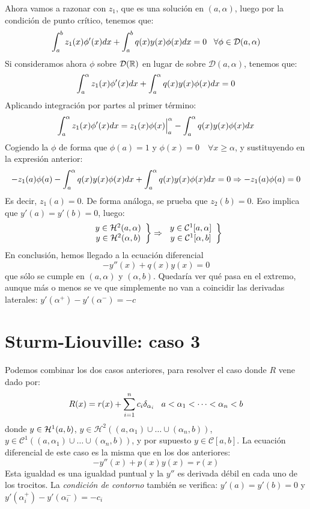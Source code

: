 Ahora vamos a razonar con $z_1$, que es una solución en $(a,\alpha)$, luego por la condición de punto crítico, tenemos que:
\[
\integral{a}{b}{z_1(x)\phi'(x)dx}+\integral{a}{b}{q(x)y(x)\phi(x)dx}=0 \espacio \forall\phi\in\mathcal{D}(a,\alpha)
\]
Si consideramos ahora $\phi$ sobre $\mathcal{D}(\R)$ en lugar de sobre $\mathcal{D}(a,\alpha)$, tenemos que:
\[
\integral{a}{\alpha}{z_1(x)\phi'(x)dx}+\integral{a}{\alpha}{q(x)y(x)\phi(x)dx}=0
\] 
Aplicando integración por partes al primer término:
\[
\integral{a}{\alpha}{z_1(x)\phi'(x)dx}=z_1(x)\phi(x)\Big|_a^\alpha-\integral{a}{\alpha}{q(x)y(x)\phi(x)dx}
\]
Cogiendo la $\phi$ de forma que $\phi(a)=1$ y $\phi(x)=0\quad\forall x\geq\alpha$, y sustituyendo en la expresión anterior:
\[
-z_1(a)\phi(a)-\integral{a}{\alpha}{q(x)y(x)\phi(x)dx}+\integral{a}{\alpha}{q(x)y(x)\phi(x)dx}=0 \Rightarrow -z_1(a)\phi(a)=0
\]
Es decir, $z_1(a)=0$. De forma análoga, se prueba que $z_2(b)=0$. Eso implica que $y'(a)=y'(b)=0$, luego: 
\[
\left.
\begin{array}{cc}
y\in\sobolev[a,\alpha]{2}\\
y\in\sobolev[\alpha,b]{2}
\end{array}
\right\} \Rightarrow
\left.
\begin{array}{cc}
y\in\mathcal{C}^1[a,\alpha]\\
y\in\mathcal{C}^1[\alpha,b]
\end{array}
\right\}
\]
En conclusión, hemos llegado a la ecuación diferencial
\[
-y''(x)+q(x)y(x)=0
\]
que sólo se cumple en $(a,\alpha)$ y $(\alpha,b)$. Quedaría ver qué pasa en el extremo, aunque más o menos se ve que simplemente no van a coincidir las derivadas laterales: $y'(\alpha^+)-y'(\alpha^-)=-c$

\section{Sturm-Liouville: caso 3}\label{slc3}

Podemos combinar los dos casos anteriores, para resolver el caso donde $R$ vene dado por:
\[
R(x)=r(x)+\sum_{i=1}^nc_i\delta_{\alpha_i} \espacio a<\alpha_1<\cdots<\alpha_n<b
\]
donde $y\in\sobolev{1}$, $y\in\mathcal{H}^2\left((a,\alpha_1)\cup\dots\cup(\alpha_n,b)\right)$, $y\in\mathcal{C}^1\left((a,\alpha_1)\cup\dots\cup(\alpha_n,b)\right)$, y por supuesto $y\in\mathcal{C}[a,b]$. La ecuación diferencial de este caso es la misma que en los dos anteriores:
\[
-y''(x)+p(x)y(x)=r(x)
\]
Esta igualdad es una igualdad puntual y la $y''$ es derivada débil en
cada uno de los trocitos. La \textit{condición de contorno} también se
verifica: $y'(a)=y'(b)=0$ y $y'(\alpha^+_i)-y'(\alpha^-_i)=-c_i$

